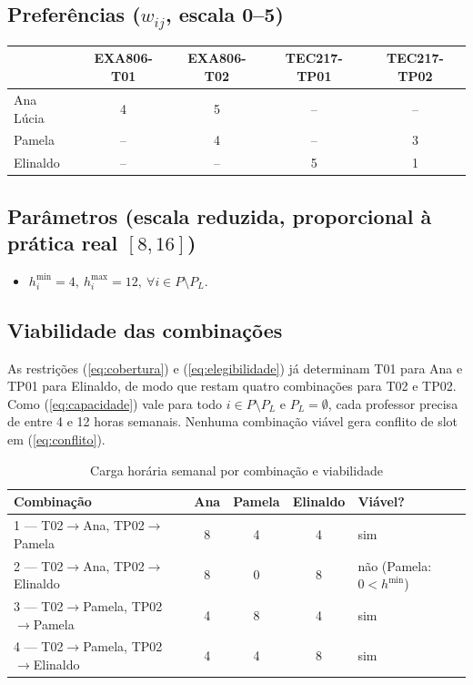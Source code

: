 \documentclass[11pt,a4paper]{article}
\begin{document}
\subsection{Preferências ($w_{ij}$, escala 0--5)}
\begin{center}
\begin{tabular}{lcccc}
\toprule
 & EXA806-T01 & EXA806-T02 & TEC217-TP01 & TEC217-TP02 \\
\midrule
Ana Lúcia & 4 & 5 & -- & -- \\
Pamela    & -- & 4 & -- & 3 \\
Elinaldo  & -- & -- & 5 & 1 \\
\bottomrule
\end{tabular}
\end{center}

\subsection{Parâmetros (escala reduzida, proporcional à prática real $[8,16]$)}
\begin{itemize}
    \item $h_i^{\min}=4,\ h_i^{\max}=12,\ \forall i\in P\setminus P_L$.
\end{itemize}

\subsection{Viabilidade das combinações}

As restrições (\ref{eq:cobertura}) e (\ref{eq:elegibilidade}) já determinam T01 para Ana e TP01 para Elinaldo, de modo que restam quatro combinações para T02 e TP02. Como (\ref{eq:capacidade}) vale para todo $i\in P\setminus P_L$ e $P_L=\emptyset$, cada professor precisa de entre 4 e 12 horas semanais. Nenhuma combinação viável gera conflito de slot em (\ref{eq:conflito}).

\begin{table}[htbp]
\centering
\caption{Carga horária semanal por combinação e viabilidade}
\label{tab:viabilidade}
\small
\begin{tabular}{lcccl}
\toprule
Combinação & Ana & Pamela & Elinaldo & Viável? \\
\midrule
1 --- T02$\to$Ana, TP02$\to$Pamela      & 8 & 4 & 4 & sim \\
2 --- T02$\to$Ana, TP02$\to$Elinaldo    & 8 & 0 & 8 & não (Pamela: $0<h^{\min}$) \\
3 --- T02$\to$Pamela, TP02$\to$Pamela   & 4 & 8 & 4 & sim \\
4 --- T02$\to$Pamela, TP02$\to$Elinaldo & 4 & 4 & 8 & sim \\
\bottomrule
\end{tabular}
\end{table}
\end{document}
